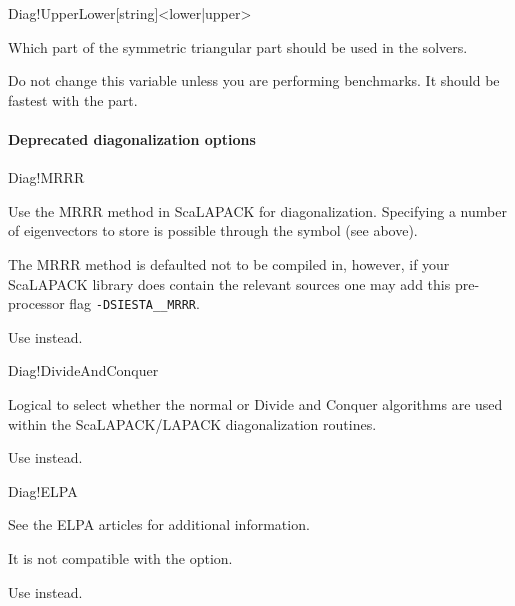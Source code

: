 \begin{fdfentry}{Diag!UpperLower}[string]<lower|upper>

  Which part of the symmetric triangular part should be used in the
  solvers.

  \note Do not change this variable unless you are performing
  benchmarks. It should be fastest with the  part.

\end{fdfentry}

\paragraph{Deprecated diagonalization options}


\begin{fdflogicalF}{Diag!MRRR}

  Use the MRRR method in ScaLAPACK for diagonalization. Specifying a
  number of eigenvectors to store is possible through the symbol
   (see above).

  \note The MRRR method is defaulted not to be compiled in, however,
  if your ScaLAPACK library does contain the relevant sources one
  may add this pre-processor flag \texttt{-DSIESTA\_\_MRRR}.

  \note Use  instead.
  
\end{fdflogicalF}

\begin{fdflogicalT}{Diag!DivideAndConquer}

  Logical to select whether the normal or Divide and Conquer
  algorithms are used within the ScaLAPACK/LAPACK diagonalization
  routines.

  \note Use  instead.

\end{fdflogicalT}

\begin{fdflogicalF}{Diag!ELPA}

  See the ELPA articles\cite{ELPA,ELPA-1} for additional information. 

  \note It is not compatible with the 
  option.

  \note Use  instead.

\end{fdflogicalF}


